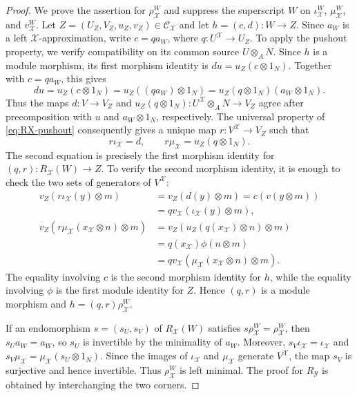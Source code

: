 \documentclass[11pt,reqno]{amsart}
\theoremstyle{definition}
\theoremstyle{remark}
\numberwithin{equation}{section}
\begin{document}
\begin{proof}
We prove the assertion for $\rho_{\mathcal X}^W$ and suppress the
superscript $W$ on $\iota_{\mathcal X}^W$,
$\mu_{\mathcal X}^W$, and $v_{\mathcal X}^W$.
Let $Z=(U_Z,V_Z,u_Z,v_Z)\in\mathcal C_{\mathcal X}$ and let
$h=(c,d):W\to Z$.  Since $a_W$ is a left $\mathcal X$-approximation,
write $c=qa_W$, where $q:U^{\mathcal X}\to U_Z$.  To apply the pushout
property, we verify compatibility on its common source $U\otimes_AN$.
Since $h$ is a module morphism, its first morphism identity is
$du=u_Z(c\otimes1_N)$.  Together with $c=qa_W$, this gives
\[
 du=u_Z(c\otimes1_N)=u_Z((qa_W)\otimes1_N)
   =u_Z(q\otimes1_N)(a_W\otimes1_N).
\]
Thus the maps $d:V\to V_Z$ and
$u_Z(q\otimes1_N):U^{\mathcal X}\otimes_AN\to V_Z$ agree after
precomposition with $u$ and $a_W\otimes1_N$, respectively.  The universal
property of \eqref{eq:RX-pushout} consequently gives a unique map
$r:V^{\mathcal X}\to V_Z$ such that
\[
 r\iota_{\mathcal X}=d,
 \qquad r\mu_{\mathcal X}=u_Z(q\otimes1_N).
\]
The second equation is precisely the first morphism identity for
$(q,r):R_{\mathcal X}(W)\to Z$.  To verify the second morphism identity,
it is enough to check the two sets of generators of $V^{\mathcal X}$:
\begin{align*}
 v_Z(r\iota_{\mathcal X}(y)\otimes m)
 &=v_Z(d(y)\otimes m)=c(v(y\otimes m))\\
 &=qv_{\mathcal X}(\iota_{\mathcal X}(y)\otimes m),\\
 v_Z(r\mu_{\mathcal X}(x_{\mathcal X}\otimes n)\otimes m)
 &=v_Z(u_Z(q(x_{\mathcal X})\otimes n)\otimes m)\\
 &=q(x_{\mathcal X})\phi(n\otimes m)\\
 &=qv_{\mathcal X}(\mu_{\mathcal X}(x_{\mathcal X}\otimes n)\otimes m).
\end{align*}
The equality involving $c$ is the second morphism identity for $h$, while
the equality involving $\phi$ is the first module identity for $Z$.
Hence $(q,r)$ is a module morphism and
$h=(q,r)\rho_{\mathcal X}^W$.

If an endomorphism $s=(s_U,s_V)$ of $R_{\mathcal X}(W)$ satisfies
$s\rho_{\mathcal X}^W=\rho_{\mathcal X}^W$, then $s_Ua_W=a_W$, so $s_U$ is invertible by the
minimality of $a_W$.  Moreover,
$s_V\iota_{\mathcal X}=\iota_{\mathcal X}$ and
$s_V\mu_{\mathcal X}=\mu_{\mathcal X}(s_U\otimes1_N)$.  Since the images
of $\iota_{\mathcal X}$ and $\mu_{\mathcal X}$ generate
$V^{\mathcal X}$, the map $s_V$ is surjective and hence invertible.  Thus
$\rho_{\mathcal X}^W$ is left minimal.  The proof for
$R_{\mathcal Y}$ is obtained by interchanging the two corners.
\end{proof}
\end{document}
